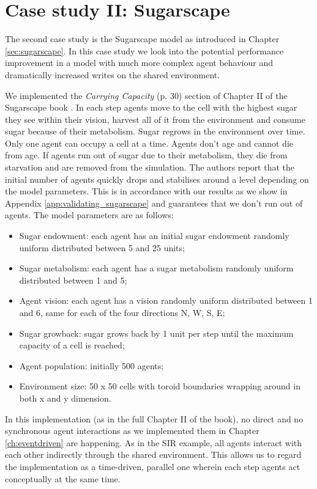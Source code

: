\section{Case study II: Sugarscape}
\label{sec:sugarscape_concurrent}
The second case study is the Sugarscape model as introduced in Chapter \ref{sec:sugarscape}. In this case study we look into the potential performance improvement in a model with much more complex agent behaviour and dramatically increased writes on the shared environment.

We implemented the \textit{Carrying Capacity} (p. 30) section of Chapter II of the Sugarscape book \cite{epstein_growing_1996}. In each step agents move to the cell with the highest sugar they see within their vision, harvest all of it from the environment and consume sugar because of their metabolism. Sugar regrows in the environment over time. Only one agent can occupy a cell at a time. Agents don't age and cannot die from age. If agents run out of sugar due to their metabolism, they die from starvation and are removed from the simulation. The authors report that the initial number of agents quickly drops and stabilises around a level depending on the model parameters. This is in accordance with our results as we show in Appendix \ref{app:validating_sugarscape} and guarantees that we don't run out of agents. The model parameters are as follows:

\begin{itemize}
	\item Sugar endowment: each agent has an initial sugar endowment randomly uniform distributed between 5 and 25 units;
	\item Sugar metabolism: each agent has a sugar metabolism randomly uniform distributed between 1 and 5;
	\item Agent vision: each agent has a vision randomly uniform distributed between 1 and 6, same for each of the four directions N, W, S, E;
	\item Sugar growback: sugar grows back by 1 unit per step until the maximum capacity of a cell is reached;
	\item Agent population: initially 500 agents;
	\item Environment size: 50 x 50 cells with toroid boundaries wrapping around in both x and y dimension.
\end{itemize}

In this implementation (as in the full Chapter II of the book), no direct and no synchronous agent interactions as we implemented them in Chapter \ref{ch:eventdriven} are happening. As in the SIR example, all agents interact with each other indirectly through the shared environment. This allows us to regard the implementation as a time-driven, parallel one wherein each step agents act conceptually at the same time.

